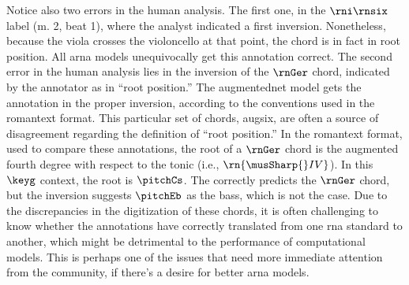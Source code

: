 Notice also two errors in the human analysis. The first one,
in the $\rni\rnsix$ label (m. 2, beat 1), where the analyst
indicated a first inversion. Nonetheless, because the viola
crosses the violoncello at that point, the chord is in fact
in root position. All \gls{arna} models unequivocally get
this annotation correct. The second error in the human
analysis lies in the inversion of the $\rnGer$ chord,
indicated by the annotator as in ``root position.'' The
\gls{augmentednet} model gets the annotation in the proper
inversion, according to the conventions used in the
\gls{romantext} format. This particular set of chords,
\gls{augsix}, are often a source of disagreement regarding
the definition of ``root position.'' In the \gls{romantext}
format, used to compare these annotations, the root of a
$\rnGer$ chord is the augmented fourth degree with respect
to the tonic (i.e., $\rn{\musSharp{}IV}$). In this $\keyg$
context, the root is $\pitchCs$. The
\textcite{micchi2021deep} correctly predicts the $\rnGer$
chord, but the inversion suggests $\pitchEb$ as the bass,
which is not the case. Due to the discrepancies in the
digitization of these chords, it is often challenging to
know whether the annotations have correctly translated from
one \gls{rna} standard to another, which might be
detrimental to the performance of computational models. This
is perhaps one of the issues that need more immediate
attention from the community, if there's a desire for better
\gls{arna} models.